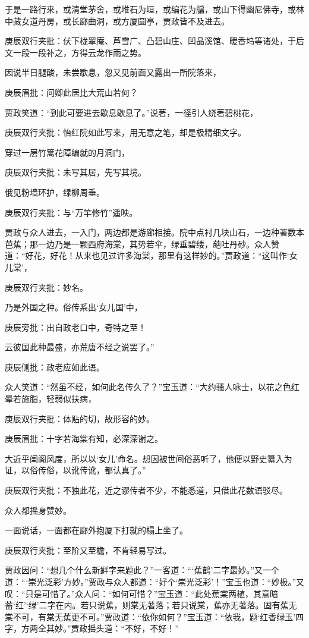 \begin{parag}
    于是一路行来，或清堂茅舍，或堆石为垣，或编花为牖，或山下得幽尼佛寺，或林中藏女道丹房，或长廊曲洞，或方厦圆亭，贾政皆不及进去。\begin{note}庚辰双行夹批：伏下栊翠庵、芦雪广、凸碧山庄、凹晶溪馆、暖香坞等诸处，于后文一段一段补之，方得云龙作雨之势。\end{note}因说半日腿酸，未尝歇息，忽又见前面又露出一所院落来，\begin{note}庚辰眉批：问卿此居比大荒山若何？\end{note}贾政笑道：“到此可要进去歇息歇息了。”说著，一径引人绕著碧桃花，\begin{note}庚辰双行夹批：怡红院如此写来，用无意之笔，却是极精细文字。\end{note}穿过一层竹篱花障编就的月洞门，\begin{note}庚辰双行夹批：未写其居，先写其境。\end{note}俄见粉墙环护，绿柳周垂。\begin{note}庚辰双行夹批：与“万竿修竹”遥映。\end{note}贾政与众人进去，一入门，两边都是游廊相接。院中点衬几块山石，一边种著数本芭蕉；那一边乃是一颗西府海棠，其势若伞，绿垂碧缕，葩吐丹砂。众人赞道：“好花，好花！从来也见过许多海棠，那里有这样妙的。”贾政道：“这叫作‘女儿棠’，\begin{note}庚辰双行夹批：妙名。\end{note}乃是外国之种。俗传系出‘女儿国’中，\begin{note}庚辰旁批：出自政老口中，奇特之至！\end{note}云彼国此种最盛，亦荒唐不经之说罢了。”\begin{note}庚辰侧批：政老应如此语。\end{note}众人笑道：“然虽不经，如何此名传久了？”宝玉道：“大约骚人咏士，以花之色红晕若施脂，轻弱似扶病，\begin{note}庚辰双行夹批：体贴的切，故形容的妙。\end{note}\begin{note}庚辰眉批：十字若海棠有知，必深深谢之。\end{note}大近乎闺阁风度，所以以‘女儿’命名。想因被世间俗恶听了，他便以野史纂入为证，以俗传俗，以讹传讹，都认真了。”\begin{note}庚辰双行夹批：不独此花，近之谬传者不少，不能悉道，只借此花数语驳尽。\end{note}众人都摇身赞妙。
\end{parag}


\begin{parag}
    一面说话，一面都在廊外抱厦下打就的榻上坐了。\begin{note}庚辰双行夹批：至阶又至檐，不肯轻易写过。\end{note}贾政因问：“想几个什么新鲜字来题此？”一客道：“‘蕉鹤’二字最妙。”又一个道：“‘崇光泛彩’方妙。”贾政与众人都道：“好个‘崇光泛彩’！”宝玉也道：“妙极。”又叹：“只是可惜了。”众人问：“如何可惜？”宝玉道：“此处蕉棠两植，其意暗蓄‘红’‘绿’二字在内。若只说蕉，则棠无著落；若只说棠，蕉亦无著落。固有蕉无棠不可，有棠无蕉更不可。”贾政道：“依你如何？”宝玉道：“依我，题‘红香绿玉’四字，方两全其妙。”贾政摇头道：“不好，不好！”
\end{parag}


